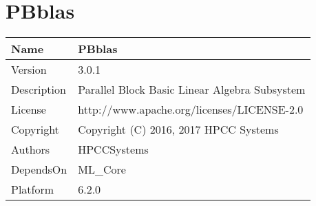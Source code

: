 \chapter*{PBblas}
\hypertarget{ecldoc:toc:PBblas}{}

\begin{tabularx}{\textwidth}{|l|X|}
\hline
Name & PBblas \\
\hline
Version & 3.0.1 \\
\hline
Description & Parallel Block Basic Linear Algebra Subsystem \\
\hline
License & http://www.apache.org/licenses/LICENSE-2.0 \\
\hline
Copyright & Copyright (C) 2016, 2017 HPCC Systems \\
\hline
Authors & HPCCSystems \\
\hline
DependsOn & ML\_Core \\
\hline
Platform & 6.2.0 \\
\hline
\end{tabularx}


